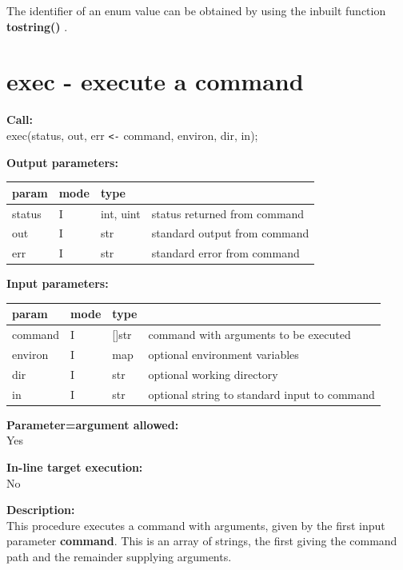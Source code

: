         The identifier of an enum value can be obtained by using
        the inbuilt function {\bf tostring()} .


    \section{exec - execute a command}\label{sec:ipexec}
        
        {\bf Call:} \\
        exec(status, out, err \verb'<-' command, environ, dir, in);
        
        {\bf Output parameters:} \\
        \begin{tabular}{| l | l | l | l |}
        \hline
        param  & mode     & type  & \\
        \hline \hline
        status & I & int, uint & status returned from command     \\ \hline
        out    & I & str       & standard output from command     \\ \hline
        err    & I & str       & standard error from command     \\ \hline
        \end{tabular}
        
        {\bf Input parameters:} \\
        \begin{tabular}{| l | l | l | l |}
        \hline
        param  & mode     & type  & \\
        \hline \hline
        command & I & []str & command with arguments to be executed        \\ \hline
        environ & I & map   & optional environment variables               \\ \hline
        dir     & I & str   & optional working directory                   \\ \hline
        in      & I & str   & optional string to standard input to command \\ \hline
        \end{tabular}
        
        {\bf Parameter=argument allowed:} \\
        Yes
        
        {\bf In-line target execution:} \\
        No
        
        {\bf Description:} \\
        This procedure executes a command with arguments, given by the first
        input parameter {\bf command}. This is an array of strings, the first
        giving the command path and the remainder supplying arguments.

